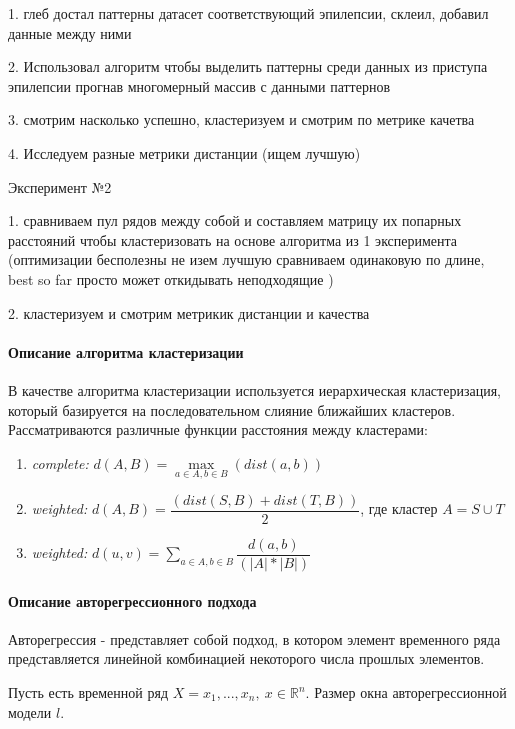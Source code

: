 \documentclass[12pt,twoside]{article}
\begin{document}
						1. глеб достал паттерны датасет соответствующий эпилепсии, склеил, добавил данные между ними
						
						2. Использовал алгоритм чтобы выделить паттерны среди данных из приступа эпилепсии прогнав многомерный массив с данными паттернов
						
						3. смотрим насколько успешно, кластеризуем и смотрим по метрике качетва
						
						4. Исследуем разные метрики дистанции (ищем лучшую)
						
						Эксперимент №2
						
						1. сравниваем пул рядов между собой и составляем матрицу их попарных расстояний чтобы кластеризовать на основе алгоритма из 1 эксперимента (оптимизации бесполезны не изем лучшую сравниваем одинаковую по длине, best so far просто может откидывать неподходящие )
						
						2. кластеризуем и смотрим метрикик дистанции и качества
						
						
      \iffalse
		    \paragraph{Описание алгоритма кластеризации}      
            В качестве алгоритма кластеризации используется иерархическая кластеризация, который базируется на последовательном слияние ближайших кластеров.
            Рассматриваются различные функции расстояния между кластерами: 
            \begin{enumerate}
                \item \textit{complete:}  $d(A, B) = \max\limits_{a \in A, b \in B}(dist(a, b))$ 
                \item \textit{weighted:}  $d(A,B) = \dfrac{(dist(S,B) + dist(T,B))}{2}$, где кластер $A = S \cup T$
                \item \textit{weighted:}  $d(u,v) = \sum\limits_{a \in A, b \in B} \dfrac{d(a, b)}{(|A|*|B|)}$ 
            \end{enumerate} 

        \paragraph{Описание авторегрессионного подхода}
            Авторегрессия - представляет собой подход, в котором элемент временного ряда представляется линейной комбинацией некоторого числа прошлых элементов.

            Пусть есть временной ряд $X = x_1, ... , x_n, \ x \in \mathbb{R}^n$.
            Размер окна авторегрессионной модели $l$.
\end{document}
